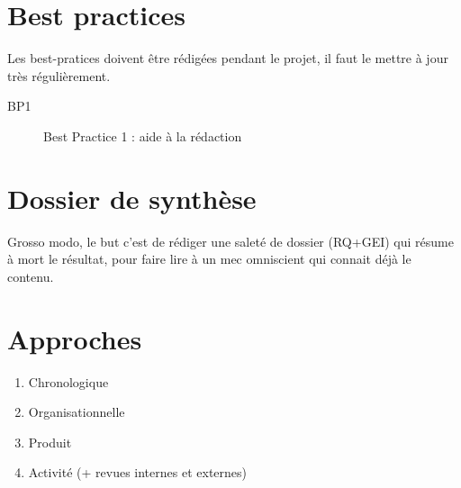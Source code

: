 \section{Best practices}

Les best-pratices doivent être rédigées pendant le projet, il faut le mettre à
jour très régulièrement.

\begin{description}
	\item[BP1] Best Practice 1 : aide à la rédaction
\end{description}

\section{Dossier de synthèse}

Grosso modo, le but c'est de rédiger une saleté de dossier (RQ+GEI) qui résume
à mort le résultat, pour faire lire à un mec omniscient qui connait déjà le
contenu.

\section{Approches}
\begin{enumerate}
	\item Chronologique
	\item Organisationnelle
	\item Produit
	\item Activité (+ revues internes et externes)
\end{enumerate}
